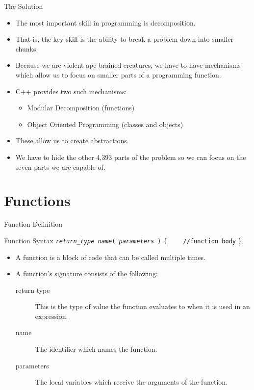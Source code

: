 \documentclass[]{beamer}
\begin{document}
\begin{frame}{The Solution}
    \begin{itemize}[<+->]
        \item The most important skill in programming is
            decomposition.
        \item That is, the key skill is the ability to break a 
            problem down into smaller chunks.
        \item Because we are violent ape-brained creatures, we have
            to have mechanisms which allow us to focus on smaller
            parts of a programming function.
        \item C++ provides two such mechanisms:
            \begin{itemize}
                \item Modular Decomposition (functions)
                \item Object Oriented Programming (classes and
                    objects)
            \end{itemize}
        \item These allow us to create abstractions.
        \item We have to hide the other 4,393 parts of the problem so
            we can focus on the seven parts we are capable of.
    \end{itemize}
\end{frame}

\section{Functions}

\begin{frame}[fragile]{Function Definition}
    \begin{block}{Function Syntax}
        \texttt{\textit{return\_type} \textit{name}( \textit{parameters} )}
        \newline\texttt{\{}
        \newline\verb!    //function body!
        \newline\texttt{\}}
    \end{block}

    \begin{itemize}[<+(2)->]
        \item A function is a block of code that can be called
            multiple times. 
        \item A function's signature consists of the following:
        \begin{description}
            \item[return type] This is the type of value the function
                evaluates to when it is used in an expression.
            \item[name] The identifier which names the function.
            \item[parameters] The local variables which receive the
                arguments of the function.
        \end{description}
    \end{itemize}
\end{frame}
\end{document}
